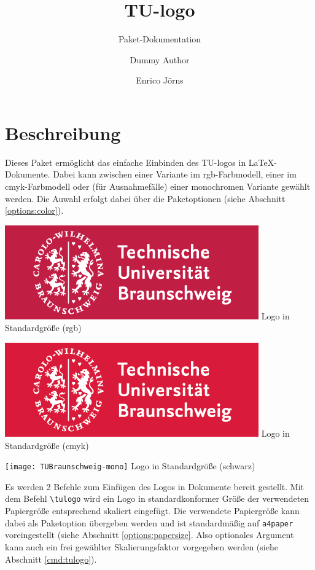 \documentclass{scrartcl}
\title{TU-logo}
\subtitle{Paket-Dokumentation}
\author{Dummy Author \and Enrico Jörns}
\begin{document}
\maketitle

\section{Beschreibung}

Dieses Paket ermöglicht das einfache Einbinden des TU-logos in \LaTeX-Dokumente.
Dabei kann zwischen einer Variante im rgb-Farbmodell, einer im
cmyk-Farbmodell oder (für Ausnahmefälle) einer monochromen Variante gewählt
werden. Die Auwahl erfolgt dabei über die Paketoptionen
(siehe Abschnitt \ref{options:color}).

\begin{minipage}{0.5\textwidth}
  \centering
  \includegraphics[width=\tulogoWidth]{TUBraunschweig-rgb}
  {\sffamily Logo in Standardgröße (rgb)}
\end{minipage}
\begin{minipage}{0.5\textwidth}
  \centering
  \includegraphics[width=\tulogoWidth]{TUBraunschweig-cmyk}
  {\sffamily Logo in Standardgröße (cmyk)}
\end{minipage}

\begin{minipage}{0.5\textwidth}
  \centering
  \texttt{[image: TUBraunschweig-mono]}
  {\sffamily Logo in Standardgröße (schwarz)}
\end{minipage}

Es werden 2 Befehle zum Einfügen des Logos in Dokumente bereit gestellt.
Mit dem Befehl {\color{tuRed}\lstinline{\tulogo}} wird ein Logo in
standardkonformer Größe der verwendeten Papiergröße entsprechend skaliert
eingefügt. Die verwendete Papiergröße kann dabei als Paketoption übergeben
werden und ist standardmäßig auf \lstinline{a4paper} voreingestellt
(siehe Abschnitt \ref{options:papersize}.
Also optionales Argument kann auch ein frei gewählter Skalierungsfaktor
vorgegeben werden (siehe Abschnitt \ref{cmd:tulogo}).
\end{document}
